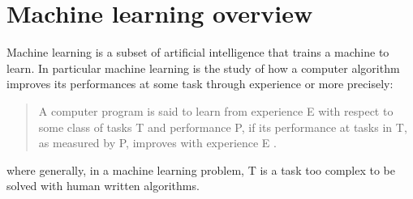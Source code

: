 



\section{Machine learning overview}
\label{sec:ml}
Machine learning is a subset of artificial intelligence that trains a machine to learn. In particular machine learning is the study of how a computer algorithm improves its performances at some task through experience or more precisely:
\begin{quote}
    \centering
    A computer program is said to learn from experience E with respect to some class of tasks T and performance P, if its performance at tasks in T, as measured by P, improves with experience E \cite{mltm}.
\end{quote}
\noindent where generally, in a machine learning problem, T is a task too complex to be solved with human written algorithms.\\

